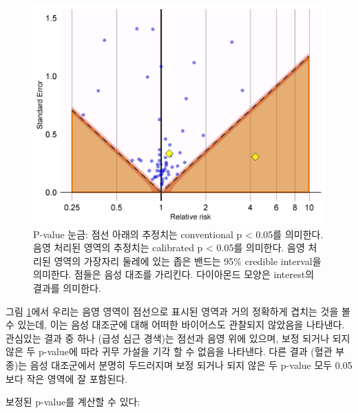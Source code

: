 \documentclass[11pt]{book}
\newenvironment{Shaded}{\begin{snugshade}}{\end{snugshade}}
\newcommand{\KeywordTok}[1]{\textcolor[rgb]{0.13,0.29,0.53}{\textbf{#1}}}
\newcommand{\DataTypeTok}[1]{\textcolor[rgb]{0.13,0.29,0.53}{#1}}
\newcommand{\StringTok}[1]{\textcolor[rgb]{0.31,0.60,0.02}{#1}}
\newcommand{\OperatorTok}[1]{\textcolor[rgb]{0.81,0.36,0.00}{\textbf{#1}}}
\newcommand{\NormalTok}[1]{#1}
\theoremstyle{definition}
\theoremstyle{definition}
\theoremstyle{definition}
\theoremstyle{remark}
\begin{document}
\begin{figure}

{\centering \includegraphics[width=0.7\linewidth]{images/MethodValidity/pValueCal} 

}

\caption{P-value 눈금: 점선 아래의 추정치는 conventional p < 0.05를 의미한다. 음영 처리된 영역의 추정치는 calibrated p < 0.05를 의미한다. 음영 처리된 영역의 가장자리 둘레에 있는 좁은 밴드는 95\% credible interval을 의미한다. 점들은 음성 대조를 가리킨다. 다이아몬드 모양은 interest의 결과를 의미한다.}\label{fig:pValueCal}
\end{figure}

그림 \ref{fig:pValueCal}에서 우리는 음영 영역이 점선으로 표시된 영역과
거의 정확하게 겹치는 것을 볼 수 있는데, 이는 음성 대조군에 대해 어떠한
바이어스도 관찰되지 않았음을 나타낸다. 관심있는 결과 중 하나 (급성 심근
경색)는 점선과 음영 위에 있으며, 보정 되거나 되지 않은 두 p-value에 따라
귀무 가설을 기각 할 수 없음을 나타낸다. 다른 결과 (혈관 부종)는 음성
대조군에서 분명히 두드러지며 보정 되거나 되지 않은 두 p-value 모두
0.05보다 작은 영역에 잘 포함된다.

보정된 p-value를 계산할 수 있다:

\begin{Shaded}
\end{Shaded}
\end{document}
